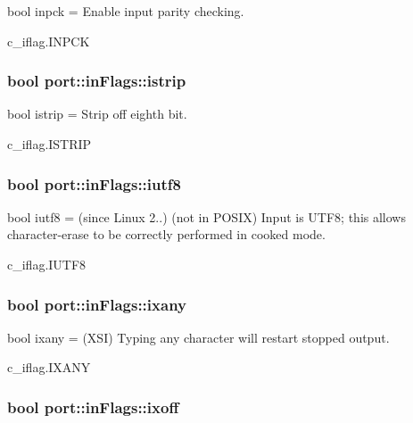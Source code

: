 bool inpck = Enable input parity checking. 

c\+\_\+iflag.\+I\+N\+P\+CK
\subsubsection[{\texorpdfstring{istrip}{istrip}}]{\setlength{\rightskip}{0pt plus 5cm}bool port\+::in\+Flags\+::istrip}\hypertarget{classport_1_1inFlags_a73a9e0705199e32a3b3cce9aa8d8c6e0}{}\label{classport_1_1inFlags_a73a9e0705199e32a3b3cce9aa8d8c6e0}


bool istrip = Strip off eighth bit. 

c\+\_\+iflag.\+I\+S\+T\+R\+IP
\subsubsection[{\texorpdfstring{iutf8}{iutf8}}]{\setlength{\rightskip}{0pt plus 5cm}bool port\+::in\+Flags\+::iutf8}\hypertarget{classport_1_1inFlags_af4f6bd13e2baf854c3b750f8b765ac42}{}\label{classport_1_1inFlags_af4f6bd13e2baf854c3b750f8b765ac42}


bool iutf8 = (since Linux 2..) (not in P\+O\+S\+IX) Input is U\+T\+F8; this allows character-\/erase to be correctly performed in cooked mode. 

c\+\_\+iflag.\+I\+U\+T\+F8
\subsubsection[{\texorpdfstring{ixany}{ixany}}]{\setlength{\rightskip}{0pt plus 5cm}bool port\+::in\+Flags\+::ixany}\hypertarget{classport_1_1inFlags_a3ee201d186e1037b5c8df599c737b251}{}\label{classport_1_1inFlags_a3ee201d186e1037b5c8df599c737b251}


bool ixany = (X\+SI) Typing any character will restart stopped output. 

c\+\_\+iflag.\+I\+X\+A\+NY
\subsubsection[{\texorpdfstring{ixoff}{ixoff}}]{\setlength{\rightskip}{0pt plus 5cm}bool port\+::in\+Flags\+::ixoff}\hypertarget{classport_1_1inFlags_ac62b0bf89cf9133983b14a850e41b14d}{}\label{classport_1_1inFlags_ac62b0bf89cf9133983b14a850e41b14d}


